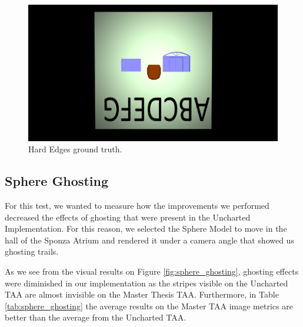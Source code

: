 \documentclass[pregrado]{tesis-usb} %
\begin{document}
\begin{figure}[H]
	\centering
	\includegraphics[scale=0.09]{images/results/hard_test_sobel_ground_truth.png}
	\caption{Hard Edges ground truth.}\label{fig:hard_test_truth}
\end{figure}


\subsection{Sphere Ghosting}
For this test, we wanted to measure how the improvements we performed decreased the effects of ghosting that were present in the Uncharted Implementation. For this reason, we selected the Sphere Model to move in the hall of the Sponza Atrium and rendered it under a camera angle that showed us ghosting trails. 

As we see from the visual results on Figure \ref{fig:sphere_ghosting}, ghosting effects were diminished in our implementation as the stripes visible on the Uncharted TAA are almost invisible on the Master Thesis TAA. Furthermore, in Table \ref{tab:sphere_ghosting} the average results on the Master TAA image metrics are better than the average from the Uncharted TAA. 
\end{document}
